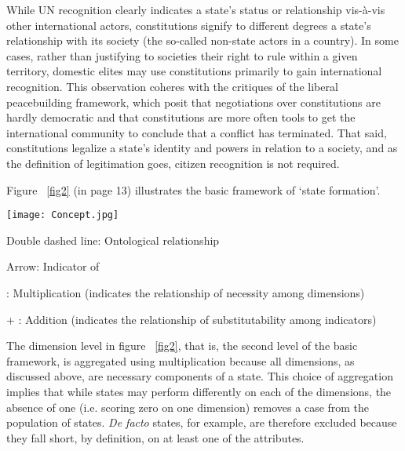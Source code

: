 \documentclass [11pt]{article}
\begin{document}
While UN recognition clearly indicates a state's status or relationship vis-à-vis other international actors, constitutions signify to different degrees a state's relationship with its society (the so-called non-state actors in a country). In some cases, rather than justifying to societies their right to rule within a given territory, domestic elites may use constitutions primarily to gain international recognition. This observation coheres with the critiques of the liberal peacebuilding framework, which posit that negotiations over constitutions are hardly democratic and that constitutions are more often tools to get the international community to conclude that a conflict has terminated. That said, constitutions legalize a state's identity and powers in relation to a society, and as the definition of legitimation goes, citizen recognition is not required.

Figure ~\ref{fig2} (in page 13) illustrates the basic framework of `state formation'.

\begin{sidewaysfigure}[ht]
\caption{Basic Framework of State Formation}
\label{fig2}
\begin{center} 
\texttt{[image: Concept.jpg]}

{\footnotesize Double dashed line: Ontological relationship}

{\footnotesize Arrow: Indicator of}

{\footnotesize * : Multiplication (indicates the relationship of necessity among dimensions)}

{\footnotesize + : Addition (indicates the relationship of substitutability among indicators)}
  
\end{center}
\end{sidewaysfigure}

The dimension level in figure ~\ref{fig2}, that is, the second level of the basic framework, is aggregated using multiplication because all dimensions, as discussed above, are necessary components of a state. This choice of aggregation implies that while states may perform differently on each of the dimensions, the absence of one (i.e. scoring zero on one dimension) removes a case from the population of states. \emph{De facto} states, for example, are therefore excluded because they fall short, by definition, on at least one of the attributes.

\end{document}
